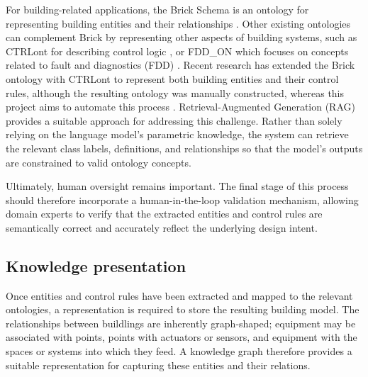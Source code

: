 \documentclass{article}
\begin{document}
For building-related applications, the Brick Schema is an ontology for representing building entities and their relationships \parencite{balaji2016}. Other existing ontologies can complement Brick by representing other aspects of building systems, such as CTRLont for describing control logic \parencite{schneider2017}, or FDD\_ON which focuses on concepts related to fault and diagnostics (FDD) \parencite{chen2026}. Recent research has extended the Brick ontology with CTRLont to represent both building entities and their control rules, although the resulting ontology was manually constructed, whereas this project aims to automate this process \parencite{li2026}. Retrieval-Augmented Generation (RAG) provides a suitable approach for addressing this challenge. Rather than solely relying on the language model's parametric knowledge, the system can retrieve the relevant class labels, definitions, and relationships so that the model's outputs are constrained to valid ontology concepts.

Ultimately, human oversight remains important. The final stage of this process should therefore incorporate a human-in-the-loop validation mechanism, allowing domain experts to verify that the extracted entities and control rules are semantically correct and accurately reflect the underlying design intent.

\subsection{Knowledge presentation}

Once entities and control rules have been extracted and mapped to the relevant ontologies, a representation is required to store the resulting building model. The relationships between buildlings are inherently graph-shaped; equipment may be associated with points, points with actuators or sensors, and equipment with the spaces or systems into which they feed. A knowledge graph therefore provides a suitable representation for capturing these entities and their relations. 
\end{document}
